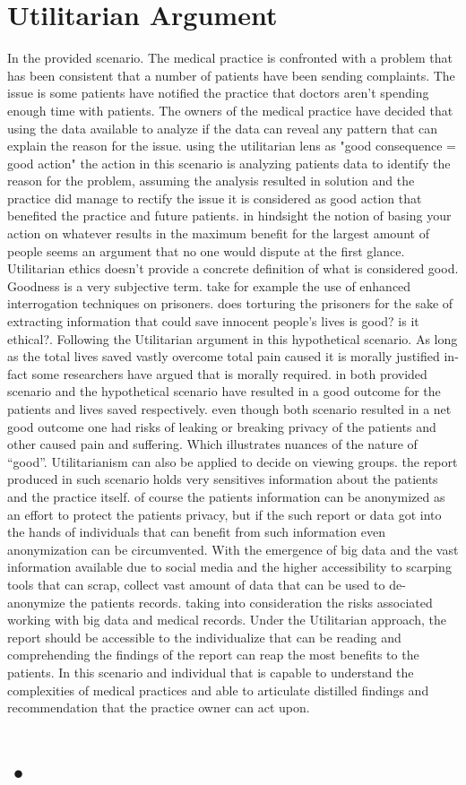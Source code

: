 \documentclass{article}
\begin{document}
\section{Utilitarian Argument}
In the provided scenario. The medical practice is confronted with a problem that has been consistent that a number of patients have been sending complaints. The issue is some patients have notified the practice that doctors aren't spending enough time with patients. The owners of the medical practice have decided that using the data available to analyze if the data can reveal any pattern that can explain the reason for the issue. using the utilitarian lens as "good consequence = good action" the action in this scenario is analyzing patients data to identify the reason for the problem, assuming the analysis resulted in solution and the practice did manage to rectify the issue it is considered as good action that benefited the practice and future patients. in hindsight the notion of basing your action on whatever results in the maximum benefit for the largest amount of people seems an argument that no one would dispute at the first glance. Utilitarian ethics doesn't provide a concrete definition of what is considered good. Goodness is a very subjective term. take for example the use of enhanced interrogation techniques on prisoners. does torturing the prisoners for the sake of extracting information that could save innocent people's lives is good? is it ethical?. Following the Utilitarian argument in this hypothetical scenario. As long as the  total lives saved vastly overcome total pain caused it is morally justified in-fact some researchers have argued that is morally required. in both provided scenario and the hypothetical scenario have resulted in a good outcome for the patients and lives saved respectively. even though both scenario resulted in a net good outcome one had risks of leaking or breaking privacy of the patients and other caused pain and suffering. Which illustrates nuances of the nature of “good”.  Utilitarianism can also be applied to decide on viewing groups. the report produced in such scenario holds very sensitives information about the patients and the practice itself. of course the patients information can be anonymized as an effort to protect the patients privacy, but if the such report or data got into the hands of individuals that can benefit from such information even anonymization can be circumvented. With the emergence of big data and the vast information available due to social media and the higher accessibility to scarping tools that can scrap, collect vast amount of data that can be used to de-anonymize the patients records. taking into consideration the risks associated working with big data and medical records. Under the Utilitarian approach, the report should be accessible to the individualize that can be reading and comprehending the findings of the report can reap the most benefits to the patients. In this scenario and individual that is capable to understand the complexities of medical practices and able to articulate distilled findings and recommendation that the practice owner can act upon. 


\section{•}  



\newpage
 

\end{document}
